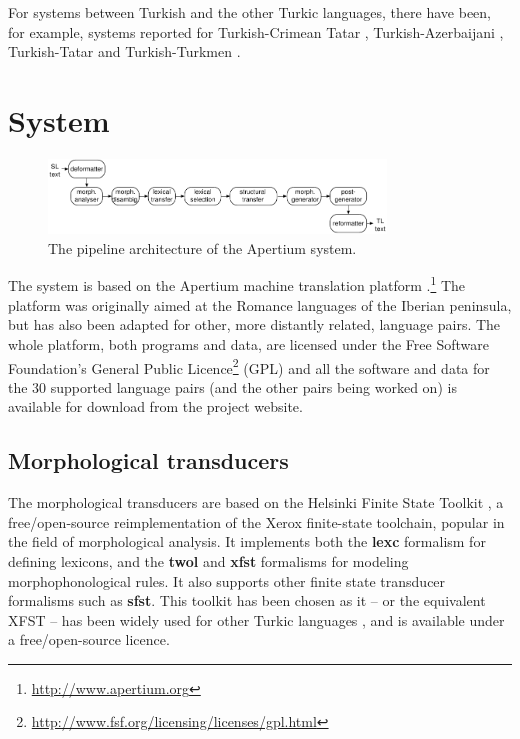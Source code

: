 \documentclass[11pt,a4paper]{article}
\begin{document}
For systems between Turkish and the other Turkic languages, there have been, 
for example, systems reported for Turkish-Crimean Tatar \cite{altintas01}, Turkish-Azerbaijani \cite{hamzaoglu93}, Turkish-Tatar \cite{suleymanov08} and Turkish-Turkmen \cite{tantug07}. 

\section{System}
\label{sec:sys}

\begin{figure}
\begin{center}
 \includegraphics[width=0.8\textwidth]{architecture.pdf}
\end{center}

\label{fig:modules}
\caption{The pipeline architecture of the Apertium system.}
\end{figure}

The system is based on the Apertium machine translation 
platform \cite{apertium/2011}.\footnote{\url{http://www.apertium.org}} The 
platform was originally aimed at the Romance languages of the Iberian peninsula, but has also been adapted for 
other, more distantly related, language pairs.
The whole platform, both programs and data, are licensed under the Free Software Foundation's General Public 
Licence\footnote{\url{http://www.fsf.org/licensing/licenses/gpl.html}} (GPL) and all the software and data for the 
30 supported language pairs (and the other pairs being worked on) is available for download from the project 
website.

\subsection{Morphological transducers}

The morphological transducers are based on the Helsinki Finite State Toolkit \cite{hfst/2011}, a free/open-source reimplementation of the Xerox finite-state toolchain, popular in the field of morphological analysis. It implements both the \textbf{lexc} formalism for defining lexicons, and the \textbf{twol} and \textbf{xfst} formalisms for modeling morphophonological rules. It also supports other finite state transducer formalisms such as \textbf{sfst}. This toolkit has been chosen as it -- or the equivalent XFST -- has been widely used for other Turkic languages \cite{coltekin2010,altintas2001,tantug2006}, and is available under a free/open-source licence.
\end{document}
